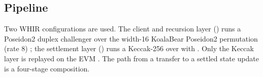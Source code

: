 \subsection{Pipeline}

Two WHIR configurations are used. The client and recursion layer
() runs a Poseidon2 duplex challenger over the width-16
KoalaBear Poseidon2 permutation (rate 8)
;
the settlement layer () runs a Keccak-256
 over  with
 . Only the Keccak
layer is replayed on the EVM . The
path from a transfer to a settled state update is a four-stage composition.

